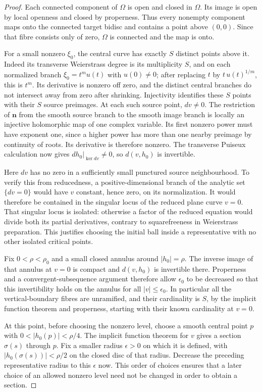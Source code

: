 \documentclass[11pt,a4paper]{article}
\theoremstyle{remark}
\begin{document}
\begin{proof}
Each connected component of $\Omega$ is open and closed in $\Omega$.
Its image is open by local openness and closed by properness.  Thus
every nonempty component maps onto the connected target bidisc and
contains a point above $(0,0)$.  Since that fibre consists only of zero,
$\Omega$ is connected and the map is onto.

For a small nonzero $\xi_0$, the central curve has exactly $S$ distinct
points above it.  Indeed its transverse Weierstrass degree is its
multiplicity $S$, and on each normalized branch
$\xi_0=t^m u(t)$ with $u(0)\ne0$; after replacing $t$ by
$t\,u(t)^{1/m}$, this is $t^m$.  Its derivative is nonzero off zero,
and the distinct central branches do not intersect away from zero after
shrinking.  Injectivity identifies these $S$ points with their $S$
source preimages.  At each such source point, $dv\ne0$.
The restriction of $\boldsymbol n$ from the smooth source branch to
the smooth image branch is locally an injective holomorphic map of
one complex variable.  Its first nonzero power must have exponent
one, since a higher power has more than one nearby preimage by
continuity of roots.  Its derivative is therefore nonzero.
The transverse Puiseux calculation now gives
$dh_0|_{\ker dv}\ne0$, so $d(v,h_0)$ is invertible.

Here $dv$ has no zero in a sufficiently small punctured source
neighbourhood.  To verify this from reducedness, a positive-dimensional
branch of the analytic set $\{dv=0\}$ would have $v$ constant, hence
zero, on its normalization.  It would therefore be contained in the
singular locus of the reduced plane curve $v=0$.  That singular locus
is isolated: otherwise a factor of the reduced equation would divide
both its partial derivatives, contrary to squarefreeness in
Weierstrass preparation.  This justifies choosing the initial ball
inside a representative with no other isolated critical points.

Fix $0<\rho<\rho_0$ and a small closed annulus around $|h_0|=\rho$.
The inverse image of that annulus at $v=0$ is compact and
$d(v,h_0)$ is invertible there.  Properness and a convergent-subsequence
argument therefore allow $\epsilon_0$ to be decreased so that this
invertibility holds on the annulus for all $|v|\le\epsilon_0$.
In particular all the vertical-boundary fibres are unramified, and
their cardinality is $S$, by the implicit function theorem and
properness, starting with their known cardinality at $v=0$.

At this point, before choosing the nonzero level, choose a smooth
central point $p$ with $0<|h_0(p)|<\rho/4$.  The implicit function
theorem for $v$ gives a section $\sigma(s)$ through $p$.  Fix a smaller
radius $\epsilon>0$ on which it is defined, with
$|h_0(\sigma(s))|<\rho/2$ on the closed disc of that radius.  Decrease
the preceding representative radius to this $\epsilon$ now.  This
order of choices ensures that a later choice of an allowed nonzero
level need not be changed in order to obtain a section.


\end{proof}
\end{document}

